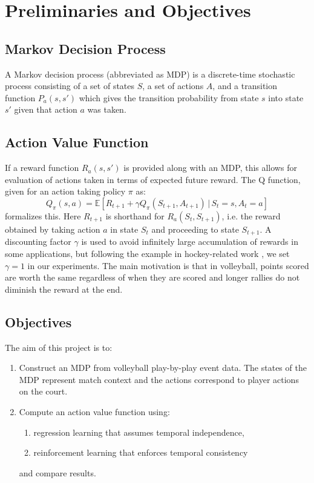 \documentclass{sfuthesis}
\begin{document}
	\section{Preliminaries and Objectives}
	\subsection{Markov Decision Process}
	A Markov decision process (abbreviated as MDP) is a discrete-time stochastic process consisting of a set of states $S$, a set of actions $A$, and a transition function $P_a(s,s')$ which gives the transition probability from state $s$ into state $s'$ given that action $a$ was taken. 
	\subsection{Action Value Function}
	\label{section:value-function}
	If a reward function $R_a(s,s')$ is provided along with an MDP, this allows for evaluation of actions taken in terms of expected future reward. The Q function, given for an action taking policy $\pi$ as:
	\begin{equation}
		Q_\pi(s,a) = \mathbb{E} \left[  R_{t+1} + \gamma Q_{\pi}(S_{t+1}, A_{t+1}) \, | \, S_t = s, A_t = a \right]
	\end{equation}
	formalizes this. Here $R_{t+1}$ is shorthand for $R_a(S_t,S_{t+1})$, i.e. the reward obtained by taking action $a$ in state $S_t$ and proceeding to state $S_{t+1}$. A discounting factor $\gamma$ is used to avoid infinitely large accumulation of rewards in some applications, but following the example in hockey-related work \cite{liu2018deep, schulte2017apples, schulte2017markov}, we set $\gamma=1$ in our experiments. The main motivation is that in volleyball, points scored are worth the same regardless of when they are scored and longer rallies do not diminish the reward at the end.
	\subsection{Objectives}
	The aim of this project is to:
	\begin{enumerate}
		\item Construct an MDP from volleyball play-by-play event data. The states of the MDP represent match context and the actions correspond to player actions on the court.
		\item Compute an action value function using:
		\begin{enumerate}
			\item regression learning that assumes temporal independence,
			\item reinforcement learning that enforces temporal consistency
		\end{enumerate}
		and compare results.
	\end{enumerate}  
	
\end{document}
